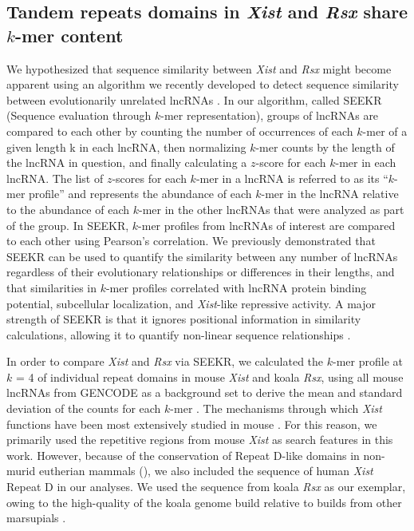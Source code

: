 \subsection{Tandem repeats domains in \emph{Xist} and \emph{Rsx} share $k$-mer content}
We hypothesized that sequence similarity between \emph{Xist} and \emph{Rsx} might become apparent using an algorithm we recently developed to detect sequence similarity between evolutionarily unrelated lncRNAs \cite{Kirk2018FunctionalContent}. In our algorithm, called SEEKR (Sequence evaluation through $k$-mer representation), groups of lncRNAs are compared to each other by counting the number of occurrences of each $k$-mer of a given length k in each lncRNA, then normalizing $k$-mer counts by the length of the lncRNA in question, and finally calculating a $z$-score for each $k$-mer in each lncRNA. The list of $z$-scores for each $k$-mer in a lncRNA is referred to as its “$k$-mer profile” and represents the abundance of each $k$-mer in the lncRNA relative to the abundance of each $k$-mer in the other lncRNAs that were analyzed as part of the group. In SEEKR, $k$-mer profiles from lncRNAs of interest are compared to each other using Pearson’s correlation. We previously demonstrated that SEEKR can be used to quantify the similarity between any number of lncRNAs regardless of their evolutionary relationships or differences in their lengths, and that similarities in $k$-mer profiles correlated with lncRNA protein binding potential, subcellular localization, and \emph{Xist}-like repressive activity. A major strength of SEEKR is that it ignores positional information in similarity calculations, allowing it to quantify non-linear sequence relationships \cite{Kirk2018FunctionalContent}. 

In order to compare \emph{Xist} and \emph{Rsx} via SEEKR, we calculated the $k$-mer profile at $k$ = 4 of individual repeat domains in mouse \emph{Xist} and koala \emph{Rsx}, using all mouse lncRNAs from GENCODE as a background set to derive the mean and standard deviation of the counts for each $k$-mer \cite{Derrien2012TheExpression}. The mechanisms through which \emph{Xist} functions have been most extensively studied in mouse \cite{Sahakyan2018TheCompensation}. For this reason, we primarily used the repetitive regions from mouse \emph{Xist} as search features in this work. However, because of the conservation of Repeat D-like domains in non-murid eutherian mammals (\cite{Nesterova2001CharacterizationSequence,Yen2007AEutheria}), we also included the sequence of human \emph{Xist} Repeat D in our analyses. We used the sequence from koala \emph{Rsx} as our exemplar, owing to the high-quality of the koala genome build relative to builds from other marsupials \cite{Johnson2018AdaptationGenome}.

